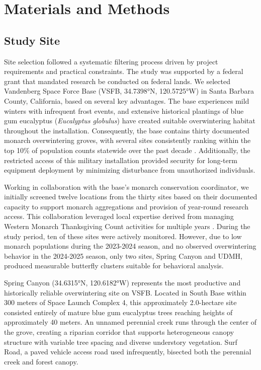 \section{Materials and Methods}

\subsection{Study Site}

Site selection followed a systematic filtering process driven by project requirements and practical constraints. The study was supported by a federal grant that mandated research be conducted on federal lands. We selected Vandenberg Space Force Base (VSFB, 34.7398°N, 120.5725°W) in Santa Barbara County, California, based on several key advantages. The base experiences mild winters with infrequent frost events, and extensive historical plantings of blue gum eucalyptus (\textit{Eucalyptus globulus}) have created suitable overwintering habitat throughout the installation. Consequently, the base contains thirty documented monarch overwintering groves, with several sites consistently ranking within the top 10\% of population counts statewide over the past decade \autocite{xercesGuideWesternMonarch2025}.  Additionally, the restricted access of this military installation provided security for long-term equipment deployment by minimizing disturbance from unauthorized individuals. 

Working in collaboration with the base's monarch conservation coordinator, we initially screened twelve locations from the thirty sites based on their documented capacity to support monarch aggregations and provision of year-round research access. This collaboration leveraged local expertise derived from managing Western Monarch Thanksgiving Count activities for multiple years \autocite{xercesGuideWesternMonarch2025}. During the study period, ten of these sites were actively monitored. However, due to low monarch populations during the 2023-2024 season, and no observed overwintering behavior in the 2024-2025 season, only two sites, Spring Canyon and UDMH, produced measurable butterfly clusters suitable for behavioral analysis.

Spring Canyon (34.6315°N, 120.6182°W) represents the most productive and historically reliable overwintering site on VSFB. Located in South Base within 300 meters of Space Launch Complex 4, this approximately 2.0-hectare site consisted entirely of mature blue gum eucalyptus trees reaching heights of approximately 40 meters. An unnamed perennial creek runs through the center of the grove, creating a riparian corridor that supports heterogeneous canopy structure with variable tree spacing and diverse understory vegetation. Surf Road, a paved vehicle access road used infrequently, bisected both the perennial creek and forest canopy. 


